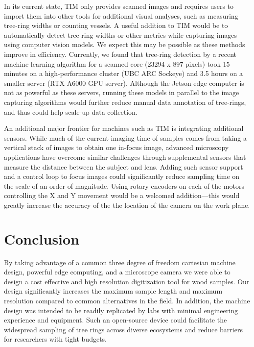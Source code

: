 \documentclass[a4paper,12pt]{article}
\begin{document}
In its current state, TIM only provides scanned images and requires users to import them into other tools for additional visual analyses, such as measuring tree-ring widths or counting vessels.
A useful addition to TIM would be to automatically detect tree-ring widths or other metrics while capturing images using computer vision models. We expect this may be possible as these methods improve in efficiency. Currently, we found that tree-ring detection by a recent machine learning algorithm  \citeauthor[R-CNN presented by][]{polacek_automation_2023} for a scanned core (23294 x 897 pixels) took 15 minutes on a high-performance cluster (UBC ARC Sockeye) and 3.5 hours on a smaller server (RTX A6000 GPU server). 
Although the Jetson edge computer is not as powerful as these servers, running these models in parallel to the image capturing algorithms would further reduce manual data annotation of tree-rings, and thus could help scale-up data collection.

An additional major frontier for machines such as TIM is integrating additional sensors. While much of the current imaging time of samples comes from taking a vertical stack of images to obtain one in-focus image, advanced microscopy applications have overcome similar challenges through supplemental sensors that measure the distance between the subject and lens.
Adding such sensor support and a control loop to focus images could significantly reduce sampling time on the scale of an order of magnitude. 
Using rotary encoders on each of the motors controlling the X and Y movement would be a welcomed addition---this would greatly increase the 
accuracy of the the location of the camera on the work plane.  

\section{Conclusion} %
By taking advantage of a common three degree of freedom cartesian machine design, powerful edge computing, and a microscope camera we were able to design a cost effective and high resolution digitization tool for wood samples. 
Our design significantly increases the maximum sample length and maximum resolution compared to common alternatives in the field. 
In addition, the machine design was intended to be readily replicated by labs with minimal engineering experience and equipment. 
Such an open-source device could facilitate the widespread sampling of tree rings across diverse ecosystems and reduce barriers for researchers with tight budgets. 
\end{document}
